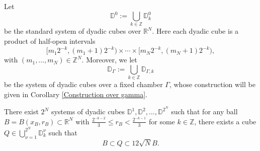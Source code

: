 \documentclass[12pt]{amsart}
\begin{document}
\begin{nota}\label{standardsystem}
Let $$\mathbb{D}^0:=\bigcup_{k\in\mathbb{Z}}\mathbb{D}_k^0$$ be the standard system of dyadic cubes over $\mathbb{R}^N$.
Here each dyadic cube is a product of half-open intervals
\[
[m_1 2^{-k}, (m_1+1)2^{-k}) \times \cdots \times [m_N 2^{-k}, (m_N+1)2^{-k}),
\]
with $(m_1,\ldots,m_N)\in \mathbb{Z}^N$. Moreover, we let $$\mathbb{D}_{\Gamma}:=\bigcup_{k\in\mathbb{Z}}\mathbb{D}_{\Gamma,k}$$ be the system of dyadic cubes over a fixed chamber $\Gamma$, whose  construction will be given in Corollary \ref{Construction over gamma}.
\end{nota}


\begin{lemma}\label{Nsystems}
There exist $2^N$ systems of dyadic cubes $\mathbb{D}^1,\mathbb{D}^2,\ldots,\mathbb{D}^{2^N}$ such that for any ball $B=B(x_B,r_B)\subset \mathbb{R}^N$ with $\frac{2^{-k-2}}{3}\leq r_B< \frac{2^{-k-1}}{3}$ for some $k\in\mathbb{Z}$,  there exists a cube ${\displaystyle Q\in\bigcup_{\nu=1}^{2^N}\mathbb{D}^\nu_k}$ such that
$$B\subset Q\subset 12\sqrt{N} B.$$
\end{lemma}
\end{document}

